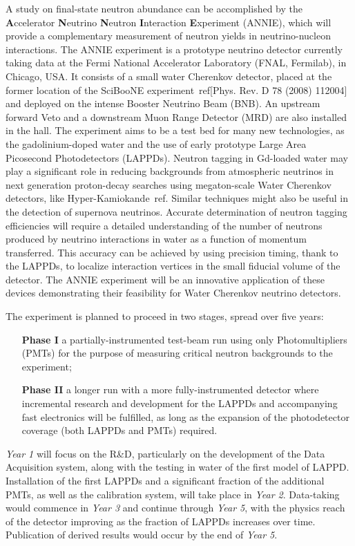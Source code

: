  A study on final-state neutron abundance can be accomplished by the %
 \textbf{A}ccelerator \textbf{N}eutrino \textbf{N}eutron \textbf{I}nteraction \textbf{E}xperiment %
 (ANNIE), which will provide a complementary measurement of neutron yields in %
 neutrino-nucleon interactions.
 The ANNIE experiment is a prototype neutrino detector currently taking data at the %
 Fermi National Accelerator Laboratory (FNAL, Fermilab), in Chicago, USA.
 It consists of a small water Cherenkov detector, placed at the former location of %
 the SciBooNE experiment~ref[Phys. Rev. D 78 (2008) 112004] and %
 deployed on the intense Booster Neutrino Beam (BNB).
 An upstream forward Veto and a downstream Muon Range Detector (MRD) are also installed %
 in the hall.
 The experiment aims to be a test bed for many new technologies, as the gadolinium-doped water %
 and the use of early prototype Large Area Picosecond Photodetectors (LAPPDs).
 Neutron tagging in Gd-loaded water may play a significant role
 in reducing backgrounds from atmospheric neutrinos in next generation 
 proton-decay searches using megaton-scale Water Cherenkov detectors, like Hyper-Kamiokande~ref.
 Similar techniques might also be useful in the detection of supernova neutrinos. 
 Accurate determination of neutron tagging efficiencies will require a 
 detailed understanding of the number of neutrons produced by neutrino interactions 
 in water as a function of momentum transferred.
 This accuracy can be achieved by using precision timing, thank to the LAPPDs, to localize %
 interaction vertices in the small fiducial volume of the detector.
 The ANNIE experiment will be an innovative application of these devices demonstrating %
 their feasibility for Water Cherenkov neutrino detectors.
 
 The experiment is planned to proceed in two stages, spread over five years:
 \begin{itemize}
   \item[\bfseries Phase I] a partially-instrumented test-beam run using only Photomultipliers %
     (PMTs) for the purpose of measuring critical neutron backgrounds to the experiment;
   \item[\bfseries Phase II] a longer run with a more fully-instrumented detector %
     where incremental research and development for the LAPPDs and %
     accompanying fast electronics will be fulfilled, as long as the expansion of the %
     photodetector coverage (both LAPPDs and PMTs) required.
 \end{itemize}

 \emph{Year 1} will focus on the R\&D, particularly on the development of the Data Acquisition %
 system, along with the testing in water of the first model of LAPPD. 
 Installation of the first LAPPDs and a significant fraction of the additional PMTs, as %
 well as the calibration system, will take place in \emph{Year 2}.
 Data-taking would commence in \emph{Year 3} and continue through \emph{Year 5}, %
 with the physics reach of the detector improving as the fraction of LAPPDs increases over time.
 Publication of derived results would occur by the end of \emph{Year 5}.
 
